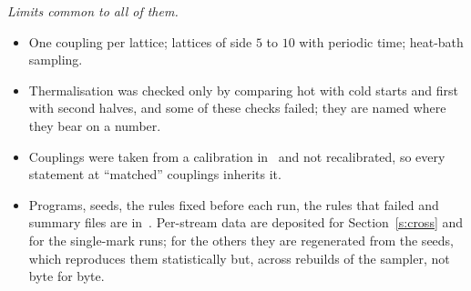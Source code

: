 \emph{Limits common to all of them.}
\begin{itemize}
\item One coupling per lattice; lattices of side $5$ to $10$ with periodic time; heat-bath sampling.
\item Thermalisation was checked only by comparing hot with cold starts and first with second halves, and
some of these checks failed; they are named where they bear on a number.
\item Couplings were taken from a calibration in~\cite{RepoData} and not recalibrated, so every statement at
``matched'' couplings inherits it.
\item Programs, seeds, the rules fixed before each run, the rules that failed and summary files are
in~\cite{RepoData}. Per-stream data are deposited for Section~\ref{s:cross} and for the single-mark runs; for
the others they are regenerated from the seeds, which reproduces them statistically but, across rebuilds of
the sampler, not byte for byte.
\end{itemize}

